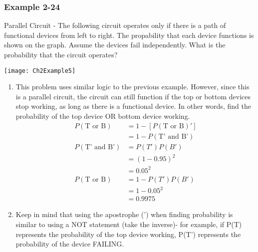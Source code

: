 \documentclass[../INDE315.tex]{subfiles}
\begin{document}
\subsubsection*{Example 2-24}
\begin{exmp}
    Parallel Circuit - The following circuit operates only if there is a path of functional devices from left to right. The propability that each device functions is shown on the graph. Assume the devices fail independently. What is the probability that the circuit operates?
    \begin{center}
        \texttt{[image: Ch2Example5]}
    \end{center}
\end{exmp}
\begin{enumerate}
    \item This problem uses similar logic to the previous example. However, since this is a parallel circuit, the circuit can still function if the top or bottom devices stop working, as long as there is a functional device. In other words, find the probability of the top device OR bottom device working.
        \begin{equation*}
            \begin{aligned}
                P(\text{T or B}) &= 1 - [P(\text{T or B})'] \\
                                &= 1 - P(\text{T' and B'}) \\
                P(\text{T' and B'}) &= P(T') P(B')  \\
                                    &= (1-0.95)^2 \\
                                    &= 0.05^2 \\
                P(\text{T or B}) &= 1 - P(T') P(B') \\
                                &= 1- 0.05^2 \\
                                &= 0.9975 
            \end{aligned}
        \end{equation*} 
    \item Keep in mind that using the apostrophe (') when finding probability is similar to using a NOT statement (take the inverse)- for example, if P(T) represents the probability of the top device working, P(T') represents the probability of the device FAILING.
\end{enumerate}
\end{document}
